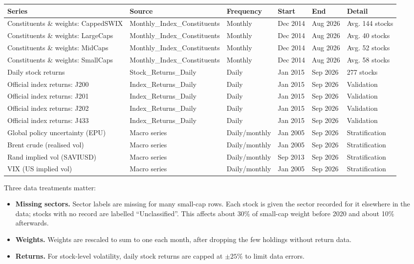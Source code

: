 \documentclass[11pt,preprint]{elsarticle}
\let\origtable\table
\let\endorigtable\endtable
\renewenvironment{table}[1][2] {
    \expandafter\origtable\expandafter[H]
} {
    \endorigtable
}
\numberwithin{equation}{section}
\numberwithin{figure}{section}
\numberwithin{table}{section}
\def\tightlist{} %
\begin{document}
\begin{table}[!htbp]
\centering
\caption{Data used} 
\label{tab:data}
\begingroup\scriptsize
\begin{tabular}{llllll}
  \hline
Series & Source & Frequency & Start & End & Detail \\ 
  \hline
Constituents \& weights: CappedSWIX & Monthly\_Index\_Constituents & Monthly & Dec 2014 & Aug 2026 & Avg. 144 stocks \\ 
  Constituents \& weights: LargeCaps & Monthly\_Index\_Constituents & Monthly & Dec 2014 & Aug 2026 & Avg. 40 stocks \\ 
  Constituents \& weights: MidCaps & Monthly\_Index\_Constituents & Monthly & Dec 2014 & Aug 2026 & Avg. 52 stocks \\ 
  Constituents \& weights: SmallCaps & Monthly\_Index\_Constituents & Monthly & Dec 2014 & Aug 2026 & Avg. 58 stocks \\ 
  Daily stock returns & Stock\_Returns\_Daily & Daily & Jan 2015 & Sep 2026 & 277 stocks \\ 
  Official index returns: J200 & Index\_Returns\_Daily & Daily & Jan 2015 & Sep 2026 & Validation \\ 
  Official index returns: J201 & Index\_Returns\_Daily & Daily & Jan 2015 & Sep 2026 & Validation \\ 
  Official index returns: J202 & Index\_Returns\_Daily & Daily & Jan 2015 & Sep 2026 & Validation \\ 
  Official index returns: J433 & Index\_Returns\_Daily & Daily & Jan 2015 & Sep 2026 & Validation \\ 
  Global policy uncertainty (EPU) & Macro series & Daily/monthly & Jan 2005 & Sep 2026 & Stratification \\ 
  Brent crude (realised vol) & Macro series & Daily/monthly & Jan 2005 & Sep 2026 & Stratification \\ 
  Rand implied vol (SAVIUSD) & Macro series & Daily/monthly & Sep 2013 & Sep 2026 & Stratification \\ 
  VIX (US implied vol) & Macro series & Daily/monthly & Jan 2005 & Sep 2026 & Stratification \\ 
   \hline
\end{tabular}
\endgroup
\end{table}

Three data treatments matter:

\begin{itemize}
\tightlist
\item
  \textbf{Missing sectors.} Sector labels are missing for many small-cap
  rows. Each stock is given the sector recorded for it elsewhere in the
  data; stocks with no record are labelled ``Unclassified''. This
  affects about 30\% of small-cap weight before 2020 and about 10\%
  afterwards.
\item
  \textbf{Weights.} Weights are rescaled to sum to one each month, after
  dropping the few holdings without return data.
\item
  \textbf{Returns.} For stock-level volatility, daily stock returns are
  capped at \(\pm 25\%\) to limit data errors.
\end{itemize}
\end{document}
